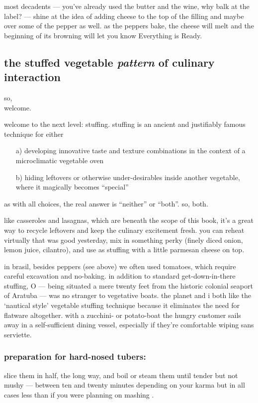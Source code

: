 most decadents --- you've already used the butter and the wine, why balk at 
the label? --- shine at the idea of adding cheese to the top of the filling 
and maybe over some of the pepper as well. as the peppers bake, the cheese 
will melt and the beginning of its browning will let you know Everything is 
Ready.

\subsection{the stuffed vegetable \textit{pattern} of culinary interaction}

so,\\
\mbox{\hskip1cm} welcome.

welcome to the next level: stuffing. stuffing is an ancient and justifiably 
famous technique for either

\begin{itemize}
  \item[a)] developing innovative taste and texture combinations in the context 
  of a microclimatic vegetable oven

  \item[b)] hiding leftovers or otherwise under-desirables inside another 
  vegetable, where it magically becomes ``special''
\end{itemize}

as with all choices, the real answer is ``neither'' or ``both''. so, both.

like casseroles and lasagnas, which are beneath the scope of this book, it's a 
great way to recycle leftovers and keep the culinary excitement fresh. you can 
reheat virtually  that was good yesterday, mix in something perky 
(finely diced onion, lemon juice, cilantro), and use as stuffing with a little 
parmesan cheese on top.

in brasil, besides peppers (see above) we often used tomatoes, which require 
careful excavation and no-baking. in addition to standard get-down-in-there 
stuffing, O  --- being situated a mere twenty feet from the historic 
colonial seaport of Aratuba --- was no stranger to vegetative boats. the 
planet and i both like the `nautical style' vegetable stuffing technique 
because it eliminates the need for flatware altogether. with a zucchini- or 
potato-boat the hungry customer sails away in a self-sufficient dining vessel, 
especially if they're comfortable wiping sans serviette.

\subsubsection{preparation for hard-nosed tubers:}
slice them in half, the long way, and boil or steam them until tender but not 
mushy --- between ten and twenty minutes depending on your karma but in all 
cases less than if you were planning on mashing .

